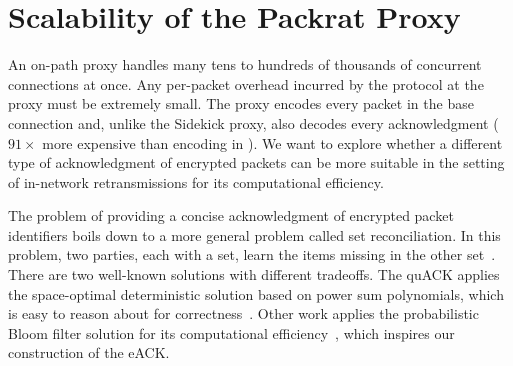 \section{Scalability of the Packrat Proxy}
\label{sec:eack}
An on-path proxy handles many tens to hundreds of thousands of concurrent connections at once.
Any per-packet overhead incurred by the \Sys protocol at the proxy must be
extremely small. The \Sys proxy encodes every packet in the base connection and, unlike
the Sidekick proxy, also decodes every acknowledgment
($91\!\times$ more expensive than encoding in \cite{yuan2024sidekick}).
We want to explore whether a different type of acknowledgment of encrypted packets
can be more suitable in the setting of in-network
retransmissions for its computational efficiency.

The problem of providing a concise acknowledgment of encrypted packet identifiers
boils down to a more general problem called set reconciliation. In this problem,
two parties, each with a set, learn the items missing in the other
set~\cite{minsky2003set,eppstein2011straggler}.
There are two well-known solutions with different tradeoffs. The quACK
applies the space-optimal deterministic solution based on
power sum polynomials, which is easy to reason about for correctness~\cite{yuan2024sidekick}.
Other work applies the probabilistic Bloom filter solution
for its computational efficiency~\cite{yang2024practical,summermatter2021byzantine},
which inspires our construction of the eACK.






